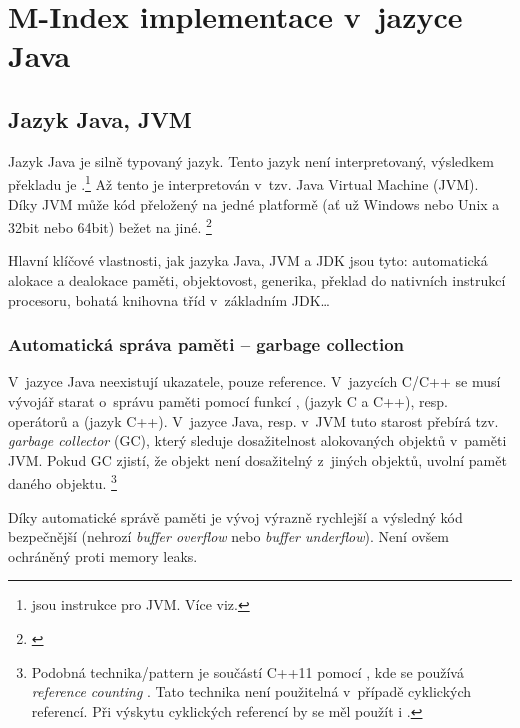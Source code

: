 \chapter{M-Index implementace v~jazyce Java}


\section{Jazyk Java, JVM}

Jazyk Java je silně typovaný jazyk. Tento jazyk není interpretovaný,
výsledkem překladu je \bytecode{}.\footnote{\bytecode{} jsou instrukce pro JVM. Více viz. } Až tento \bytecode{} je interpretován
v~tzv. Java Virtual Machine (JVM).
Díky JVM může kód přeložený na jedné platformě (ať už Windows nebo Unix a 32bit nebo 64bit) bežet na jiné. \footnote{\emph{}\cite{lindholm2013java}}

Hlavní klíčové vlastnosti, jak jazyka Java, JVM a JDK
jsou tyto: automatická alokace a dealokace paměti, objektovost, generika,
překlad \bytecode{} do nativních instrukcí procesoru, bohatá
knihovna tříd v~základním JDK\ldots{}


\subsection{Automatická správa paměti -- garbage collection}

V~jazyce Java neexistují ukazatele, pouze reference. V~jazycích C/C++
se musí vývojář starat o~správu paměti pomocí funkcí ,
 (jazyk C a C++), resp. operátorů  a 
(jazyk C++). V~jazyce Java, resp. v~JVM \cite{lindholm2013java} tuto starost přebírá tzv. \emph{garbage
collector} (GC), který sleduje
dosažitelnost alokovaných objektů v~paměti JVM. Pokud GC
zjistí, že objekt není dosažitelný z~jiných objektů, uvolní pamět daného objektu.
\footnote{Podobná technika/pattern je součástí C++11 pomocí ,
kde se používá \emph{reference counting} \cite{ISO:2012:CPP}. Tato technika není použitelná v~případě cyklických referencí. Při výskytu cyklických referencí by se měl použít i .
}

Díky automatické správě paměti je vývoj výrazně rychlejší a výsledný
kód bezpečnější (nehrozí \emph{buffer overflow} nebo \emph{buffer underflow}). Není ovšem ochráněný proti
memory leaks.

